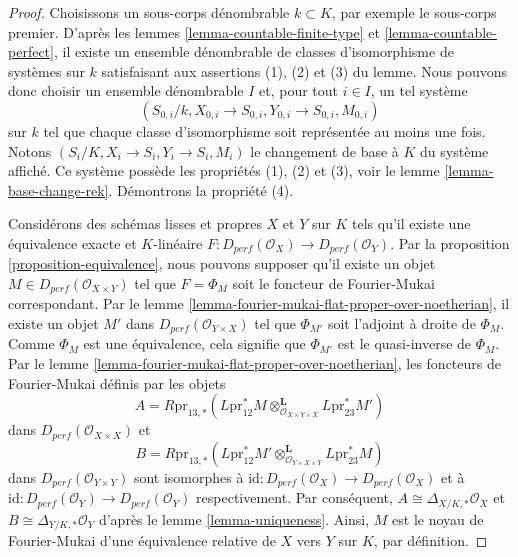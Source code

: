 \begin{proof}
Choisissons un sous-corps dénombrable $k \subset K$, par exemple le sous-corps premier.
D'après les lemmes \ref{lemma-countable-finite-type} et \ref{lemma-countable-perfect},
il existe un ensemble dénombrable de classes d'isomorphisme de systèmes
sur $k$ satisfaisant aux assertions (1), (2) et (3) du lemme.
Nous pouvons donc choisir un ensemble dénombrable
$I$ et, pour tout $i \in I$, un tel système
$$
(S_{0, i}/k, X_{0, i} \to S_{0, i}, Y_{0, i} \to S_{0, i}, M_{0, i})
$$
sur $k$ tel que chaque classe d'isomorphisme soit représentée au moins une fois.
Notons $(S_i/K, X_i \to S_i, Y_i \to S_i, M_i)$ le changement de base
à $K$ du système affiché. Ce système possède les propriétés (1), (2) et (3),
voir le lemme \ref{lemma-base-change-rek}. Démontrons la propriété (4).

\medskip\noindent
Considérons des schémas lisses et propres $X$ et $Y$ sur $K$
tels qu'il existe une équivalence exacte et $K$-linéaire
$F : D_{perf}(\mathcal{O}_X) \to D_{perf}(\mathcal{O}_Y)$.
Par la proposition \ref{proposition-equivalence},
nous pouvons supposer qu'il existe un objet
$M \in D_{perf}(\mathcal{O}_{X \times Y})$
tel que $F = \Phi_M$ soit le foncteur de Fourier-Mukai correspondant.
Par le lemme \ref{lemma-fourier-mukai-flat-proper-over-noetherian},
il existe un objet $M'$ dans $D_{perf}(\mathcal{O}_{Y \times X})$
tel que $\Phi_{M'}$ soit l'adjoint à droite de $\Phi_M$.
Comme $\Phi_M$ est une équivalence, cela signifie que
$\Phi_{M'}$ est le quasi-inverse de $\Phi_M$.
Par le lemme \ref{lemma-fourier-mukai-flat-proper-over-noetherian},
les foncteurs de Fourier-Mukai définis par les objets
$$
A = R\text{pr}_{13, *}(
L\text{pr}_{12}^*M
\otimes_{\mathcal{O}_{X \times Y \times X}}^\mathbf{L}
L\text{pr}_{23}^*M')
$$
dans $D_{perf}(\mathcal{O}_{X \times X})$ et
$$
B = R\text{pr}_{13, *}(
L\text{pr}_{12}^*M'
\otimes_{\mathcal{O}_{Y \times X \times Y}}^\mathbf{L}
L\text{pr}_{23}^*M)
$$
dans $D_{perf}(\mathcal{O}_{Y \times Y})$
sont isomorphes à
$\text{id} : D_{perf}(\mathcal{O}_X) \to D_{perf}(\mathcal{O}_X)$
et à
$\text{id} : D_{perf}(\mathcal{O}_Y) \to D_{perf}(\mathcal{O}_Y)$
respectivement. Par conséquent,
$A \cong \Delta_{X/K, *}\mathcal{O}_X$ et
$B \cong \Delta_{Y/K, *}\mathcal{O}_Y$
d'après le lemme \ref{lemma-uniqueness}. Ainsi, $M$ est le
noyau de Fourier-Mukai d'une équivalence relative de $X$ vers $Y$
sur $K$, par définition.


\end{proof}
